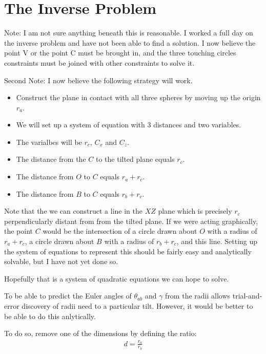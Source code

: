 \documentclass{article}
\begin{document}
\section{The Inverse Problem}

Note: I am not sure anything beneath this is reasonable.
I worked a full day on the inverse problem and have not
been able to find a solution. I now believe the point V
or the point C must be brought in, and the three touching
circles constraints must be joined with other constraints
to solve it.

Second Note: I now believe the following strategy will work.
\begin{itemize}
\item Construct the plane in contact with all three spheres
  by
  moving up the origin $r_a$.
\item We will set up a system of equation with 3 distances
  and two variables.
\item The varialbes will be $r_c$, $C_x$ and $C_z$.
\item The distance from the $C$ to the tilted plane equals $r_c$.
\item The distance from $O$ to $C$ equals $r_a + r_c$.
  \item The distance from $B$ to $C$ equals $r_b+r_c$.
\end{itemize}

Note that the we can construct a line in the $XZ$ plane which is
precisely $r_c$ perpendicularly distant from from the tilted plane.
If we were acting graphically, the point $C$ would be the intersection
of a circle drawn about $O$ with a radius of $r_a+r_c$,
a circle drawn about $B$ with a radius of $r_b+r_c$, and this line.
Setting up the system of equations to represent this should be
fairly easy and analytically solvable, but I have not yet done so.


Hopefully that is a system of quadratic equations we
can hope to solve.

To be able to predict the Euler angles of $\theta_{ab}$ and $\gamma$ from the radii allows trial-and-error
discovery of radii need to a particular tilt.  However, it would be better to be able to do this
anlytically.

To do so, remove one of the dimensions by defining the ratio:
\begin{align}
d = \frac{r_a}{r_b}
\end{align}
\end{document}
